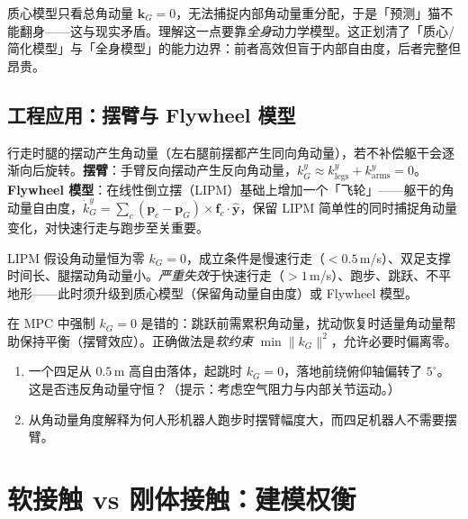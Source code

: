 \begin{insight}[猫翻身是质心模型的盲区]
质心模型只看总角动量 $\boldsymbol{k}_G=0$，无法捕捉内部角动量重分配，于是「预测」猫不能翻身——这与现实矛盾。理解这一点要靠\emph{全身}动力学模型。这正划清了「质心/简化模型」与「全身模型」的能力边界：前者高效但盲于内部自由度，后者完整但昂贵。
\end{insight}

\subsection{工程应用：摆臂与 Flywheel 模型}
\label{subsec:armswing}

行走时腿的摆动产生角动量（左右腿前摆都产生同向角动量），若不补偿躯干会逐渐向后旋转。\textbf{摆臂}：手臂反向摆动产生反向角动量，$k_G^y\approx k_{\mathrm{legs}}^y+k_{\mathrm{arms}}^y=0$。\textbf{Flywheel 模型}：在线性倒立摆（LIPM）基础上增加一个「飞轮」——躯干的角动量自由度，$\dot{k}_G^y=\sum_c(\boldsymbol{p}_c-\boldsymbol{p}_G)\times\boldsymbol{f}_c\cdot\hat{\boldsymbol{y}}$，保留 LIPM 简单性的同时捕捉角动量变化，对快速行走与跑步至关重要。

\begin{pitfall}[概念误区：LIPM 假设 $k_G=0$ 的失效条件]
LIPM 假设角动量恒为零 $k_G=0$，成立条件是慢速行走（$<0.5\,$m/s）、双足支撑时间长、腿摆动角动量小。\emph{严重失效}于快速行走（$>1\,$m/s）、跑步、跳跃、不平地形——此时须升级到质心模型（保留角动量自由度）或 Flywheel 模型。
\end{pitfall}

\begin{pitfall}
在 MPC 中强制 $k_G=0$ 是错的：跳跃前需累积角动量，扰动恢复时适量角动量帮助保持平衡（摆臂效应）。正确做法是\emph{软约束} $\min\|k_G\|^2$，允许必要时偏离零。
\end{pitfall}

\begin{practice}
\begin{enumerate}
  \item 一个四足从 $0.5\,$m 高自由落体，起跳时 $k_G=0$，落地前绕俯仰轴偏转了 $5^\circ$。这是否违反角动量守恒？（提示：考虑空气阻力与内部关节运动。）
  \item 从角动量角度解释为何人形机器人跑步时摆臂幅度大，而四足机器人不需要摆臂。
\end{enumerate}
\end{practice}

\section{软接触 vs 刚体接触：建模权衡}
\label{sec:contact-soft}

